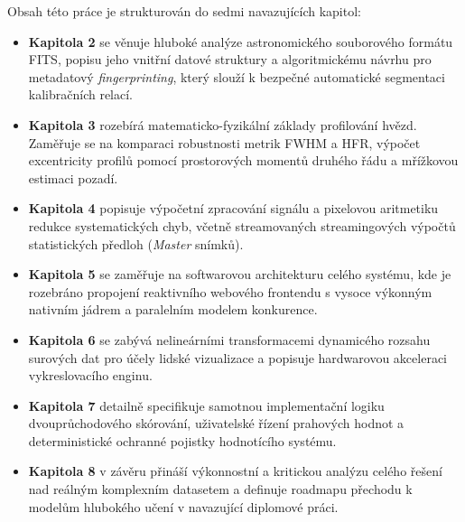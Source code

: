 Obsah této práce je strukturován do sedmi navazujících kapitol:
\begin{itemize}
    \item \textbf{Kapitola 2} se věnuje hluboké analýze astronomického souborového formátu \acs{FITS}, popisu jeho vnitřní datové struktury a algoritmickému návrhu pro metadatový \textit{fingerprinting}, který slouží k bezpečné automatické segmentaci kalibračních relací.
    \item \textbf{Kapitola 3} rozebírá matematicko-fyzikální základy profilování hvězd. Zaměřuje se na komparaci robustnosti metrik \acs{FWHM} a \acs{HFR}, výpočet excentricity profilů pomocí prostorových momentů druhého řádu a mřížkovou estimaci pozadí.
    \item \textbf{Kapitola 4} popisuje výpočetní zpracování signálu a pixelovou aritmetiku redukce systematických chyb, včetně streamovaných streamingových výpočtů statistických předloh (\textit{Master} snímků).
    \item \textbf{Kapitola 5} se zaměřuje na softwarovou architekturu celého systému, kde je rozebráno propojení reaktivního webového frontendu s vysoce výkonným nativním jádrem a paralelním modelem konkurence.
    \item \textbf{Kapitola 6} se zabývá nelineárními transformacemi dynamicého rozsahu surových dat pro účely lidské vizualizace a popisuje hardwarovou akceleraci vykreslovacího enginu.
    \item \textbf{Kapitola 7} detailně specifikuje samotnou implementační logiku dvouprůchodového skórování, uživatelské řízení prahových hodnot a deterministické ochranné pojistky hodnotícího systému.
    \item \textbf{Kapitola 8} v závěru přináší výkonnostní a kritickou analýzu celého řešení nad reálným komplexním datasetem a definuje roadmapu přechodu k modelům hlubokého učení v navazující diplomové práci.
\end{itemize}